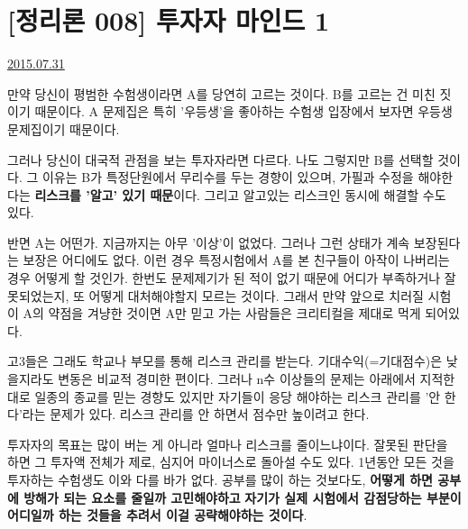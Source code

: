 \section{[정리론 008] 투자자 마인드 1}
\href{https://www.kockoc.com/Apoc/223860}{2015.07.31}

\vspace{5mm}


\noindent{}


만약 당신이 평범한 수험생이라면 A를 당연히 고르는 것이다. B를 고르는 건 미친 짓이기 때문이다.
A 문제집은 특히 '우등생'을 좋아하는 수험생 입장에서 보자면 우등생 문제집이기 때문이다.
\vspace{5mm}

그러나 당신이 대국적 관점을 보는 투자자라면 다르다. 나도 그렇지만 B를 선택할 것이다.
그 이유는 B가 특정단원에서 무리수를 두는 경향이 있으며, 가필과 수정을 해야한다는 \textbf{리스크를 '알고' 있기 때문}이다.
그리고 알고있는 리스크인 동시에 해결할 수도 있다.
\vspace{5mm}

반면 A는 어떤가. 지금까지는 아무 '이상'이 없었다. 그러나 그런 상태가 계속 보장된다는 보장은 어디에도 없다.
이런 경우 특정시험에서 A를 본 친구들이 아작이 나버리는 경우 어떻게 할 것인가.
한번도 문제제기가 된 적이 없기 때문에 어디가 부족하거나 잘못되었는지, 또 어떻게 대처해야할지 모르는 것이다.
그래서 만약 앞으로 치러질 시험이 A의 약점을 겨냥한 것이면 A만 믿고 가는 사람들은 크리티컬을 제대로 먹게 되어있다.
\vspace{5mm}

고3들은 그래도 학교나 부모를 통해 리스크 관리를 받는다. 기대수익(=기대점수)은 낮을지라도 변동은 비교적 경미한 편이다.
그러나 n수 이상들의 문제는 아래에서 지적한 대로 일종의 종교를 믿는 경향도 있지만
자기들이 응당 해야하는 리스크 관리를 '안 한다'라는 문제가 있다.
리스크 관리를 안 하면서 점수만 높이려고 한다.
\vspace{5mm}

투자자의 목표는 많이 버는 게 아니라 얼마나 리스크를 줄이느냐이다.
잘못된 판단을 하면 그 투자액 전체가 제로, 심지어 마이너스로 돌아설 수도 있다.
1년동안 모든 것을 투자하는 수험생도 이와 다를 바가 없다.
공부를 많이 하는 것보다도, \textbf{어떻게 하면 공부에 방해가 되는 요소를 줄일까 고민해야하고}
\textbf{자기가 실제 시험에서 감점당하는 부분이 어디일까 하는 것들을 추려서 이걸 공략해야하는 것이다}.
\vspace{5mm}

